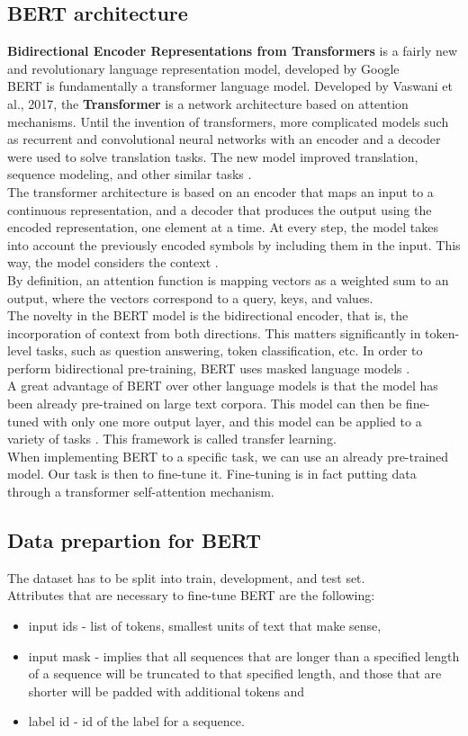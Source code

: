 \documentclass[times, utf8, zavrsni, english]{fer}
\begin{document}
\subsection{BERT architecture}
\textbf{Bidirectional Encoder Representations from Transformers} is a fairly new and revolutionary language representation model, developed by Google \citep{47751} \\
BERT is fundamentally a transformer language model.
Developed by Vaswani et al., 2017, the \textbf{Transformer} is a network architecture based on attention mechanisms. Until the invention of transformers, more complicated models such as recurrent and convolutional neural networks with an encoder and a decoder were used to solve translation tasks. The new model improved translation, sequence modeling, and other similar tasks \citep{vaswani}. \\
The transformer architecture is based on an encoder that maps an input to a continuous representation, and a decoder that produces the output using the encoded representation, one element at a time. At every step, the model takes into account the previously encoded symbols by including them in the input. This way, the model considers the context \citep{vaswani}. \\
By definition, an attention function is mapping vectors as a weighted sum to an output, where the vectors correspond to a query, keys, and values. \\
The novelty in the BERT model is the bidirectional encoder, that is, the incorporation of context from both directions. This matters significantly in token-level tasks, such as question answering, token classification, etc. In order to perform bidirectional pre-training, BERT uses masked language models \citep{47751}. \\
A great advantage of BERT over other language models is that the model has been already pre-trained on large text corpora. This model can then be fine-tuned with only one more output layer, and this model can be applied to a variety of tasks \citep{47751}. This framework is called transfer learning. \\
When implementing BERT to a specific task, we can use an already pre-trained model. Our task is then to fine-tune it.
Fine-tuning is in fact putting data through a transformer self-attention mechanism.
\subsection{Data prepartion for BERT}
The dataset has to be split into train, development, and test set.\\
Attributes that are necessary to fine-tune BERT are the following:
\begin{itemize}
	\item input ids - list of tokens, smallest units of text that make sense,
	\item  input mask - implies that all sequences that are longer than a specified length of a sequence will be truncated to that specified length, and those that are shorter will be padded with additional tokens and
	\item label id - id of the label for a sequence.
\end{itemize}
 
\end{document}
